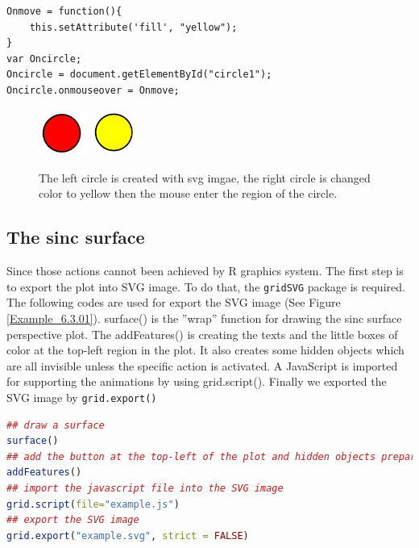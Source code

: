 \documentclass{report}
\begin{document}
\begin{lstlisting}
Onmove = function(){
    this.setAttribute('fill', "yellow");
}
var Oncircle;
Oncircle = document.getElementById("circle1");
Oncircle.onmouseover = Onmove;
\end{lstlisting}

\begin{figure}[h]
	\begin{center}
		\includegraphics[height = 1.45cm, width = 1.6cm]{figure/svg/svgdemo0.PNG}
		\hspace{4cm}
		\includegraphics[height = 1.5cm, width = 1.5cm]{figure/svg/svgdemo1.PNG}
		\caption{The left circle is created with svg imgae, the right circle is changed color to yellow then the mouse enter the region of the circle. }
		\label{Example_6.3.0}
	\end{center}
\end{figure}

\newpage
\subsection{The sinc surface}
Since those actions cannot been achieved by R graphics system. The first step is to export the plot into
SVG image. To do that, the \texttt{gridSVG} package is required. The following codes are used for export the SVG image (See Figure \ref{Example_6.3.01}). surface() is the ''wrap'' function for drawing the sinc surface perspective plot.
The addFeatures() is creating the texts and the little boxes of color at the top-left region in the plot.
It also creates some hidden objects which are all invisible unless the specific action is activated. A
JavaScript is imported for supporting the animations by using grid.script(). Finally we exported
the SVG image by \texttt{grid.export()}
\\

\begin{lstlisting}[language = R]
## draw a surface
surface()  
## add the button at the top-left of the plot and hidden objects prepare for animation
addFeatures() 
## import the javascript file into the SVG image
grid.script(file="example.js") 
## export the SVG image
grid.export("example.svg", strict = FALSE) 
\end{lstlisting}
\end{document}
